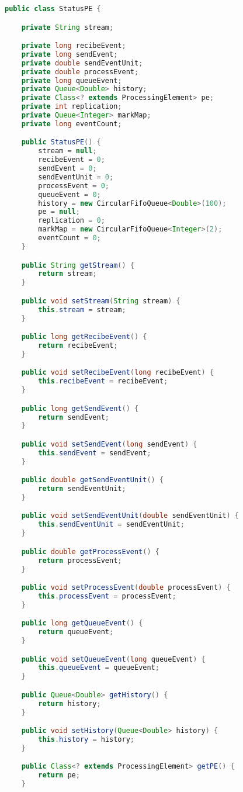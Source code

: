 \begin{lstlisting}[caption={Clase StatusPE, el cual contiene las estadísticas de un PE específico.},label={lst:statusPE},language=Java]
public class StatusPE {

	private String stream;

	private long recibeEvent;
	private long sendEvent;
	private double sendEventUnit;
	private double processEvent;
	private long queueEvent;
	private Queue<Double> history;
	private Class<? extends ProcessingElement> pe;
	private int replication;
	private Queue<Integer> markMap;
	private long eventCount;

	public StatusPE() {
		stream = null;
		recibeEvent = 0;
		sendEvent = 0;
		sendEventUnit = 0;
		processEvent = 0;
		queueEvent = 0;
		history = new CircularFifoQueue<Double>(100);
		pe = null;
		replication = 0;
		markMap = new CircularFifoQueue<Integer>(2);
		eventCount = 0;
	}

	public String getStream() {
		return stream;
	}

	public void setStream(String stream) {
		this.stream = stream;
	}

	public long getRecibeEvent() {
		return recibeEvent;
	}

	public void setRecibeEvent(long recibeEvent) {
		this.recibeEvent = recibeEvent;
	}

	public long getSendEvent() {
		return sendEvent;
	}

	public void setSendEvent(long sendEvent) {
		this.sendEvent = sendEvent;
	}

	public double getSendEventUnit() {
		return sendEventUnit;
	}

	public void setSendEventUnit(double sendEventUnit) {
		this.sendEventUnit = sendEventUnit;
	}

	public double getProcessEvent() {
		return processEvent;
	}

	public void setProcessEvent(double processEvent) {
		this.processEvent = processEvent;
	}

	public long getQueueEvent() {
		return queueEvent;
	}

	public void setQueueEvent(long queueEvent) {
		this.queueEvent = queueEvent;
	}

	public Queue<Double> getHistory() {
		return history;
	}

	public void setHistory(Queue<Double> history) {
		this.history = history;
	}

	public Class<? extends ProcessingElement> getPE() {
		return pe;
	}


\end{lstlisting}
